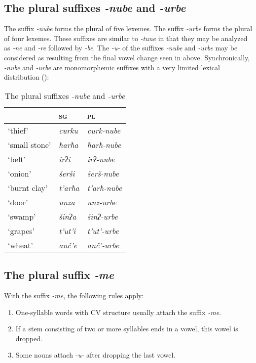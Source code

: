 ﻿\documentclass[output=paper]{langsci/langscibook}
\begin{document}
\subsection{The plural suffixes \emph{-nube} and
  \emph{-urbe}}
\label{the-plural-suffixes--nube-and--urbe}

The suffix \emph{-nube} forms the plural of five lexemes. The
suffix \emph{-urbe} forms the plural of four lexemes. These suffixes are
similar to \emph{-tune} in that they may be analyzed as \emph{-ne} and
\emph{-re} followed by \emph{-be}. The \emph{-u-} of the suffixes
\emph{-nube} and \emph{-urbe} may be considered as resulting from the
final vowel change seen in  above.
Synchronically, \emph{-nube} and \emph{-urbe} are
monomorphemic suffixes with a very limited lexical distribution ():

\begin{table}
  \caption{The plural suffixes \emph{-nube} and \emph{-urbe}}\label{tab:3:18}

\begin{tabular}{@{}lll@{}}
\toprule
& \textsc{sg} & \textsc{pl}\tabularnewline \midrule
`thief' & \emph{curku} & \emph{curk-nube}\tabularnewline
`small stone' & \emph{ħarħa} & \emph{ħarħ-nube}\tabularnewline
`belt' & \emph{irʔi} & \emph{irʔ-nube}\tabularnewline
`onion' & \emph{šerši} & \emph{šerš-nube}\tabularnewline
`burnt clay' & \emph{t'arħa} & \emph{t'arħ-nube}\tabularnewline
`door' & \emph{unza} & \emph{unz-urbe}\tabularnewline
`swamp' & \emph{šinʔa} & \emph{šinʔ-urbe}\tabularnewline
`grapes' & \emph{t'ut'i} & \emph{t'ut'-urbe}\tabularnewline
`wheat' & \emph{anč'e} & \emph{anč'-urbe}\tabularnewline
\bottomrule
\end{tabular}
\end{table}

\subsection{The plural suffix \emph{-me}}
\label{the-plural-suffix--me}

With the suffix \emph{-me}, the following rules apply:
\begin{enumerate}[topsep=\medskipamount,itemsep=0pt,partopsep=0pt,parsep=0pt,label={\arabic*})]
\item %
  One-syllable words with CV structure usually attach the suffix
\emph{-me}.

\item %
  If a stem consisting of two or more syllables ends in a vowel, this
vowel is dropped.

\item %
  Some nouns attach \emph{-u-} after dropping the last vowel.
\end{enumerate}
\end{document}
